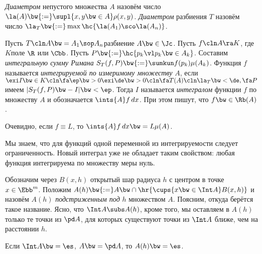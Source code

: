 \documentclass[a4paper]{article}
\begin{document}
\begin{df}
\emph{Диаметром} непустого множества $A$ назовём число $\la(A) \bw{:=}\supl{x,y \bw\in A} \rho(x,y)$.
\emph{Диаметром} разбиения $T$ назовём число $\la_T \bw{:=}\max \hc{\la(A_1)\sco \la(A_n)}$.
\end{df}

\begin{df}
Пусть $T\cln A\bw=A_1\sop A_n$\т разбиение $A\bw\in \Jc$. Пусть $f \cln A \ra K$, где $K$\т поле $\R$ или
$\Cbb$. Пусть $P \bw{:=}\hc{p_k \vl p_k \bw\in A_k}$. Составим \emph{интегральную сумму Римана} $S_T(f, P)
\bw{:=}\sumkun f(p_k)\mu(A_k)$. Функция $f$ называется \emph{интегрируемой по измеримому множеству} $A$, если
$\exi I \bw\in K\cln \fa \ep \bw> 0 \exi \de\bw>0\cln \fa T(A)\cln \la_T \bw< \de, \fa P$ имеем $|S_T(f,P)
\bw- I| \bw< \ep$. Тогда $I$ называется \emph{интегралом} функции $f$ по множеству $A$ и обозначается
$\ints{A}f \,d x$. При этом пишут, что $f \bw\in \Rb(A)$.
\end{df}

Очевидно, если $f \equiv L$, то $\ints{A}f \,dx \bw= L \mu(A)$.

\begin{note}
Мы знаем, что для функций одной переменной из интегрируемости следует ограниченность. Новый
интеграл уже не обладает таким свойством: любая функция интегрируема по множеству меры нуль.
\end{note}

\begin{df}
Обозначим через $B(x,h)$ открытый шар радиуса $h$ с центром в точке $x \in \Ebb^m$.
Положим $A(h)\bw{:=} A \bw\cap \hr{\cups{x\bw\in\Int A} B(x,h)}$ и назовём $A(h)$ \emph{подстриженным
под} $h$ множеством $A$. Поясним, откуда берётся такое название. Ясно, что $\Int A \subs A(h)$,
кроме того, мы оставляем в $A(h)$ только те точки из $\pd A$, для которых существуют точки из $\Int
A$ ближе, чем на расстоянии $h$.
\end{df}

\begin{note}
Если $\Int A \bw= \es$,  $A \bw= \pd A$, то $A(h) \bw= \es$.
\end{note}
\end{document}
